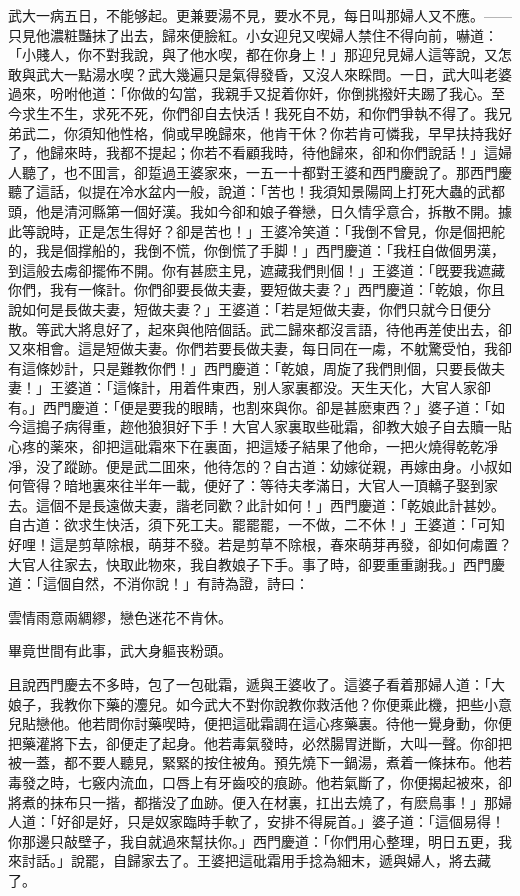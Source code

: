 武大一病五日，不能够起。更兼要湯不見，要水不見，每日叫那婦人又不應。——只見他濃粧豔抹了出去，歸來便臉紅。小女迎兒又喫婦人禁住不得向前，嚇道：「小賤人，你不對我說，與了他水喫，都在你身上！」那迎兒見婦人這等說，又怎敢與武大一點湯水喫？武大幾遍只是氣得發昏，又沒人來睬問。一日，武大叫老婆過來，吩咐他道：「你做的勾當，我親手又捉着你奸，你倒挑撥奸夫踢了我心。至今求生不生，求死不死，你們卻自去快活！我死自不妨，和你們爭執不得了。我兄弟武二，你須知他性格，倘或早晚歸來，他肯干休？你若肯可憐我，早早扶持我好了，他歸來時，我都不提起；你若不看顧我時，待他歸來，卻和你們說話！」這婦人聽了，也不囬言，卻踅過王婆家來，一五一十都對王婆和西門慶說了。那西門慶聽了這話，似提在冷水盆内一般，說道：「苦也！我須知景陽岡上打死大蟲的武都頭，他是清河縣第一個好漢。我如今卻和娘子眷戀，日久情孚意合，拆散不開。據此等說時，正是怎生得好？卻是苦也！」王婆冷笑道：「我倒不曾見，你是個把舵的，我是個撑船的，我倒不慌，你倒慌了手脚！」西門慶道：「我枉自做個男漢，到這般去䖏卻擺佈不開。你有甚麽主見，遮藏我們則個！」王婆道：「旣要我遮藏你們，我有一條計。你們卻要長做夫妻，要短做夫妻？」西門慶道：「乾娘，你且說如何是長做夫妻，短做夫妻？」王婆道：「若是短做夫妻，你們只就今日便分散。等武大將息好了，起來與他陪個話。武二歸來都沒言語，待他再差使出去，卻又來相會。這是短做夫妻。你們若要長做夫妻，每日同在一䖏，不躭驚受怕，我卻有這條妙計，只是難教你們！」西門慶道：「乾娘，周旋了我們則個，只要長做夫妻！」王婆道：「這條計，用着件東西，别人家裏都没。天生天化，大官人家卻有。」西門慶道：「便是要我的眼睛，也割來與你。卻是甚麽東西？」婆子道：「如今這搗子病得重，趂他狼狽好下手！大官人家裏取些砒霜，卻教大娘子自去贖一貼心疼的薬來，卻把這砒霜來下在裏面，把這矮子結果了他命，一把火燒得乾乾凈凈，没了蹤跡。便是武二囬來，他待怎的？自古道：幼嫁従親，再嫁由身。小叔如何管得？暗地裏來往半年一載，便好了：等待夫孝滿日，大官人一頂轎子娶到家去。這個不是長遠做夫妻，諧老同歡？此計如何！」西門慶道：「乾娘此計甚妙。自古道：欲求生快活，須下死工夫。罷罷罷，一不做，二不休！」王婆道：「可知好哩！這是剪草除根，萌芽不發。若是剪草不除根，春來萌芽再發，卻如何䖏置？大官人往家去，快取此物來，我自教娘子下手。事了時，卻要重重謝我。」西門慶道：「這個自然，不消你說！」有詩為證，詩曰：
\begin{myquote}
雲情雨意兩綢繆，戀色迷花不肯休。

畢竟世間有此事，武大身軀丧粉頭。
\end{myquote}

且說西門慶去不多時，包了一包砒霜，遞與王婆收了。這婆子看着那婦人道：「大娘子，我教你下藥的灋兒。如今武大不對你說教你救活他？你便乘此機，把些小意兒貼戀他。他若問你討藥喫時，便把這砒霜調在這心疼藥裏。待他一覺身動，你便把藥灌將下去，卻便走了起身。他若毒氣發時，必然腸胃迸斷，大叫一聲。你卻把被一蓋，都不要人聽見，緊緊的按住被角。預先燒下一鍋湯，煮着一條抹布。他若毒發之時，七竅内流血，口唇上有牙齒咬的痕跡。他若氣斷了，你便揭起被來，卻將煮的抹布只一揩，都揩没了血跡。便入在材裏，扛出去燒了，有麽鳥事！」那婦人道：「好卻是好，只是奴家臨時手軟了，安排不得屍首。」婆子道：「這個易得！你那邊只敲壁子，我自就過來幫扶你。」西門慶道：「你們用心整理，明日五更，我來討話。」說罷，自歸家去了。王婆把這砒霜用手捻為細末，遞與婦人，將去藏了。

